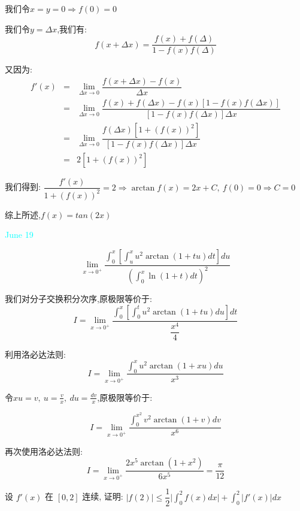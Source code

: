 \begin{solution}
	
	我们令$x=y=0\Rightarrow f(0)=0$
	
	我们令$y=\Delta x$,我们有: 
	$$f(x+\Delta x)=\dfrac{f(x)+f(\Delta)}{1-f(x)f(\Delta)}$$
	
	又因为: 
	\begin{eqnarray*}
		f'(x)&=&\lim\limits_{\Delta x\to 0}\dfrac{f(x+\Delta x)-f(x)}{\Delta x}\\
		&=&\lim\limits_{\Delta x\to 0}\dfrac{f(x )+f(\Delta x)-f(x)[1-f(x)f(\Delta x)]}{[1-f(x)f(\Delta x)]\Delta x}\\
		&=&\lim\limits_{\Delta x\to 0}\dfrac{f(\Delta x)[1+(f(x))^2]}{[1-f(x)f(\Delta x)]\Delta x}\\
		&=&2[1+(f(x))^2]
	\end{eqnarray*}
	
	我们得到: $\dfrac{f'(x)}{1+(f(x))^2}=2\Rightarrow \arctan f(x)=2x+C,\ f(0)=0\Rightarrow C=0$
	
	综上所述,$f(x)=tan (2x)$
\end{solution}


\textcolor{cyan}{June 19}

\begin{example}[][Exam: 32.3.9]
	 $$\lim\limits_{x\to 0^{+}}\dfrac{\int_{0}^{x}[\int_{u}^{x}u^2\arctan (1+tu)dt]du}{(\int_{0}^{x}\ln(1+t)dt)^2}$$
\end{example}

\begin{solution}
	
	我们对分子交换积分次序,原极限等价于: 
	$$I=\lim\limits_{x\to 0^{+}}\dfrac{\int_{0}^{x}[\int_{0}^{t}u^2\arctan (1+tu)du]dt}{\dfrac{x^4}{4}}$$
	
	利用洛必达法则: 
	$$I=\lim\limits_{x\to 0^{+}}\dfrac{\int_{0}^{x}u^2\arctan (1+xu)du}{x^3}$$
	
	令$xu=v,\ u=\frac{v}{x},\ du=\frac{dv}{x}$,原极限等价于: 
	
	$$I=\lim\limits_{x\to 0^{+}}\dfrac{\int_{0}^{x^2}v^2\arctan (1+v)dv}{x^6}$$
	
	再次使用洛必达法则: 
	$$I=\lim\limits_{x\to 0^{+}}\dfrac{2x^5\arctan (1+x^2)}{6x^5}=\dfrac{\pi}{12}$$
\end{solution}

\begin{example}[][Exam: 32.3.10]
	设 $f'(x)$ 在 $[0,2]$ 连续, 证明: $\big|f(2)\big|\leq \dfrac{1}{2}\big|\int_{0}^{2}f(x)dx\big|+\int_{0}^{2}\big|f'(x)\big|dx$
\end{example}

